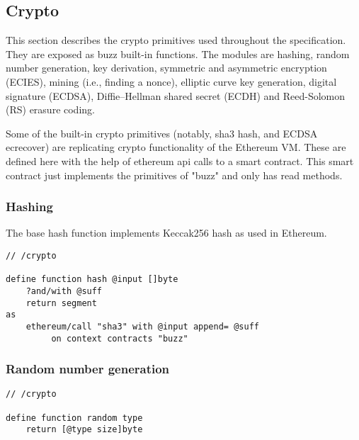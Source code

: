 \subsection{Crypto \statusgreen}\label{spec:format:crypto}

This section describes the crypto primitives used throughout the specification. They  are exposed as  buzz built-in  functions.
The modules are hashing, random number generation, key derivation, symmetric and asymmetric encryption (ECIES), mining (i.e., finding a nonce), elliptic curve key generation, digital signature (ECDSA), Diffie--Hellman shared secret (ECDH) and Reed-Solomon  (RS) erasure coding.

Some of the built-in crypto primitives (notably, sha3 hash, and ECDSA ecrecover) are replicating crypto functionality of the Ethereum VM. These are defined here with the help of ethereum api calls to a smart contract. This smart contract just implements the primitives of "buzz" and only has read methods.

\subsubsection{Hashing}

The base hash function implements Keccak256 hash as used in Ethereum.

\begin{definition}[Hashing]\label{def:hash}
\begin{lstlisting}[language=buzz1]
// /crypto

define function hash @input []byte
    ?and/with @suff
    return segment
as
    ethereum/call "sha3" with @input append= @suff
         on context contracts "buzz" 
\end{lstlisting}
\end{definition}  


\subsubsection{Random number generation}

\begin{definition}\label{def:rng}
\begin{lstlisting}[language=buzz1]
// /crypto

define function random type 
    return [@type size]byte 

\end{lstlisting}
\end{definition}    


